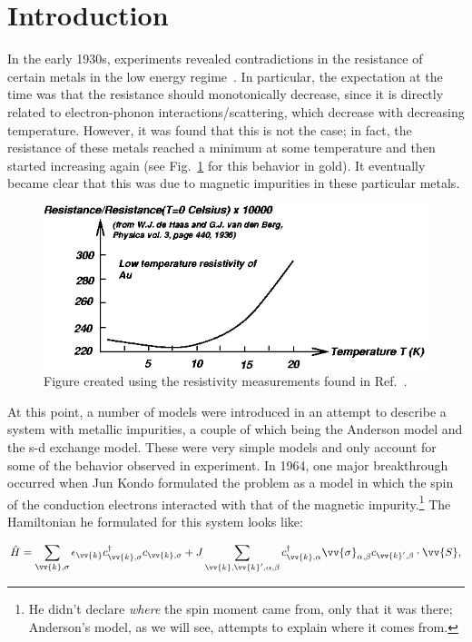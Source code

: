 \section{Introduction}

In the early 1930s, experiments revealed contradictions in the resistance of certain metals in the low energy regime~\cite{Meissner_1930}. In particular, the expectation at the time was that the resistance should monotonically decrease, since it is directly related to electron-phonon interactions/scattering, which decrease with decreasing temperature. However, it was found that this is not the case; in fact, the resistance of these metals reached a minimum at some temperature and then started increasing again (see Fig.~\ref{fig:classickondo} for this behavior in gold). It eventually became clear that this was due to magnetic impurities in these particular metals.

\begin{figure}[ht]
  \centering
  \includegraphics[width=0.6\linewidth]{../resources/gfx/classickondo.png}
  \caption{Figure created using the resistivity measurements found in Ref.~\cite{DeHaas_1936}.}
  \label{fig:classickondo}
\end{figure}

At this point, a number of models were introduced in an attempt to describe a system with metallic impurities, a couple of which being the Anderson model and the s-d exchange model. These were very simple models and only account for some of the behavior observed in experiment. In 1964, one major breakthrough occurred when Jun Kondo formulated the problem as a model in which the spin of the conduction electrons interacted with that of the magnetic impurity.\footnote{He didn't declare \textit{where} the spin moment came from, only that it was there; Anderson's model, as we will see, attempts to explain where it comes from.} The Hamiltonian he formulated for this system looks like:

\begin{equation}
  \hat{H} = \sum_{\vv{k},\sigma} \epsilon_{\vv{k}}c_{\vv{k},\sigma}^\dagger c_{\vv{k},\sigma} + J\sum_{\vv{k},\vv{k}',\alpha,\beta} c_{\vv{k},\alpha}^\dagger \vv{\sigma}_{\alpha,\beta} c_{\vv{k}',\beta} \cdot \vv{S},\label{eq:kondo-hamiltonian}
\end{equation}

